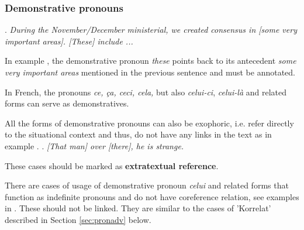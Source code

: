 \documentclass[a4paper]{article}
\begin{document}
{{\subsubsection{Demonstrative pronouns}

\ex.
{\sl During the November/December ministerial, we created consensus in [some very important areas]. [These] include ...}

In example \Last, the demonstrative pronoun {\sl these} points back to its antecedent {\sl some very important areas} mentioned in the previous sentence and must be annotated. 

In French, the pronouns \textsl{ce, ça, ceci, cela,} but also \textsl{celui-ci},
\textsl{celui-là} and related forms can serve as demonstratives.

% 

All the forms of demonstrative pronouns can also be exophoric, i.e. refer
directly to the situational context and thus, do not have any links in the text
as in example \Next. %
\ex.
\textsl{[That man] over [there], he is strange.}

These cases should be marked as {\bf extratextual reference}. 

There are cases of usage of demonstrative pronoun \textsl{celui} and related
forms that function as indefinite pronouns and do not have coreference relation,
see examples in \Next. These should not be linked. They are similar to the cases
of 'Korrelat' described in Section \ref{sec:pronadv} below.

}}
\end{document}
